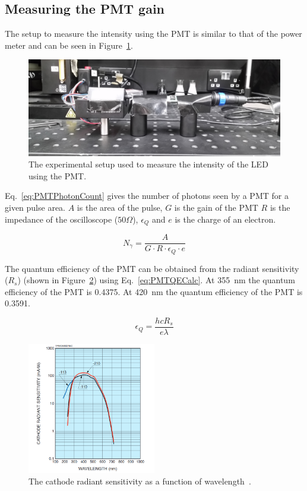 \documentclass[11pt, a4paper, oneside ]{article}
\begin{document}
\subsection{Measuring the PMT gain}

The setup to measure the intensity using the PMT is similar to that of the power meter and can be seen in Figure~\ref{fig:PMTSetup}.

\begin{figure}[H]
    \centering
    \includegraphics[width=\textwidth]{figures/PMTSetup.jpg}
    \caption{The experimental setup used to measure the intensity of the LED using the PMT.}
    \label{fig:PMTSetup}
\end{figure}

Eq.~\ref{eq:PMTPhotonCount} gives the number of photons seen by a PMT for a given pulse area. $A$ is the area of the pulse, $G$ is the gain of the PMT $R$ is the impedance of the oscilloscope ($50 \Omega$), $\epsilon_Q$ and $e$ is the charge of an electron. 

\begin{equation}
    N_\gamma = \frac{A}{G \cdot R \cdot \epsilon_Q \cdot e}
    \label{eq:PMTPhotonCount}
\end{equation}

The quantum efficiency of the PMT can be obtained from the radiant sensitivity ($R_s$) (shown in Figure~\ref{fig:pmtEfficiency}) using Eq.~\ref{eq:PMTQECalc}. At \SI{355}{nm} the quantum efficiency of the PMT is 0.4375. At \SI{420}{nm} the quantum efficiency of the PMT is 0.3591.

\begin{equation}
    \epsilon_Q = \frac{hc R_s}{e \lambda}
    \label{eq:PMTQECalc}
\end{equation}

\begin{figure}[H]
    \centering
    \includegraphics[width=0.5\textwidth]{figures/PMTEfficiency.png}
    \caption{The cathode radiant sensitivity as a function of wavelength~\cite{PMTDataSheet}.}
    \label{fig:pmtEfficiency}
\end{figure}
\end{document}
